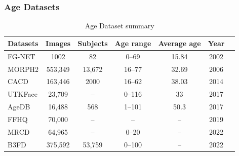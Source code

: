 \documentclass[aspectratio=169]{beamer}
\begin{document}
\begin{frame}
\frametitle{Age Datasets}
\justifying

\begin{table}[h!]
\centering
\begin{tabular}{|l|c|c|c|c|c|c|}
\hline
\textbf{Datasets} & \textbf{Images} & \textbf{Subjects} & \textbf{Age range} & \textbf{Average age} & \textbf{Year} \\ \hline
FG-NET          & 1002    & 82     & 0--69    & 15.84  & 2002 \\ 
MORPH2          & 553,349 & 13,672 & 16--77   & 32.69  & 2006 \\ 
CACD            & 163,446 & 2000   & 16--62   & 38.03  & 2014 \\ 
UTKFace         & 23,709  & --     & 0--116   & 33     & 2017 \\ 
AgeDB           & 16,488  & 568    & 1--101   & 50.3   & 2017 \\ 
FFHQ            & 70,000  & --     & --       & --     & 2019 \\ 
MRCD            & 64,965  & --     & 0--20    & --     & 2022 \\
B3FD            & 375,592  & 53,759     & 0--100    & --     & 2022 \\ \hline
\end{tabular}
\caption{Age Dataset summary}
\label{tab:ageTransDatasets}
\end{table}

\end{frame}

\end{document}
